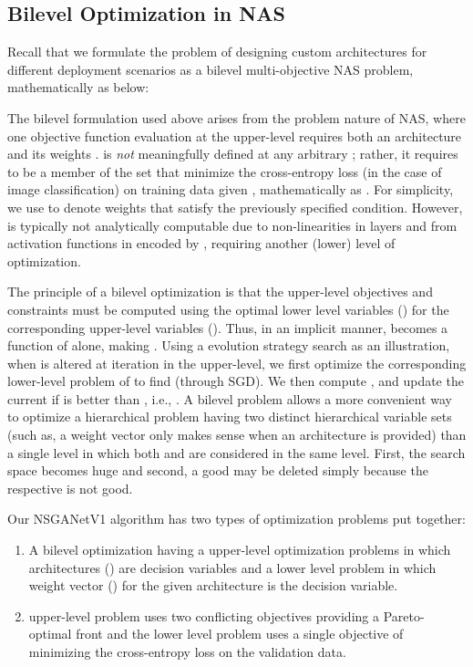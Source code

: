 \documentclass[journal]{IEEEtran}
\def\ourmethod{NSGANetV1}
\theoremstyle{definition}
\theoremstyle{remark}
\begin{document}
\subsection{Bilevel Optimization in NAS\label{sec:supple_bilevel}}
Recall that we formulate the problem of designing custom architectures for different deployment scenarios as a bilevel multi-objective NAS problem, mathematically as below:


{
The bilevel formulation used above arises from the problem nature of NAS, where one objective function  evaluation at the upper-level requires both an architecture  and its weights .  is \emph{not} meaningfully defined at any arbitrary ; rather, it requires  to be a member of the set that minimize the cross-entropy loss  (in the case of image classification) on training data given , mathematically as . For simplicity, we use  to denote weights that satisfy the previously specified condition. However,  is typically not analytically computable due to non-linearities in layers and from activation functions in encoded by , requiring another (lower) level of optimization. 

The principle of a bilevel optimization is that the upper-level objectives and constraints must be computed using the optimal lower level variables () for the corresponding upper-level variables (). Thus, in an implicit manner,  becomes a function of  alone, making . Using a  evolution strategy search as an illustration, when  is altered at iteration  in the upper-level, we first optimize the corresponding lower-level problem of  to find  (through SGD). We then compute , and update the current  if  is better than , i.e.,   . A bilevel problem allows a more convenient way to optimize a hierarchical problem having two distinct hierarchical variable sets (such as, a weight vector only makes sense when an architecture is provided) than a single level in which both  and  are considered in the same level. First, the search space becomes huge and second, a good  may be deleted simply because the respective  is not good.}

Our \ourmethod{} algorithm has two types of optimization problems put together:
\begin{enumerate}
    \item A bilevel optimization having a upper-level optimization problems in which architectures () are decision variables and a lower level problem in which weight vector () for the given architecture is the decision variable. 
    \item upper-level problem uses two conflicting objectives providing a Pareto-optimal front and the lower level problem uses a single objective of minimizing the cross-entropy loss on the validation data. 
\end{enumerate}
\end{document}
